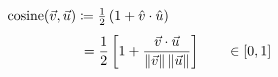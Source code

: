 \documentclass[preview,class=extarticle,14pt]{standalone}
\begin{document}
    \begin{align*}
        \operatorname{cosine}(\vec v,\vec u)
        &\coloneqq\tfrac12\left(1 + \hat v\cdot\hat u\right) \\[\jot]
        &\phantom{:}= \dfrac12\left[1 + \dfrac{\vec v\cdot\vec u}{\lVert\vec v\rVert\,\lVert\vec u\rVert}\right]
        \qquad\in\left[0,1\right]
    \end{align*}
\end{document}
